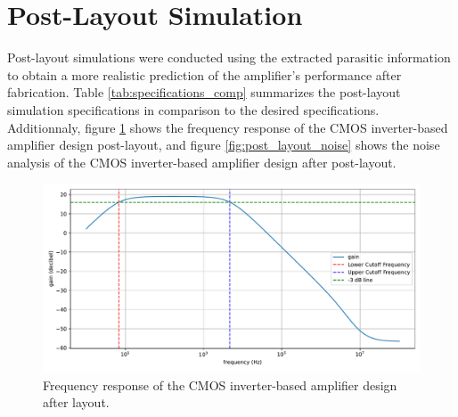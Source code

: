 \section{Post-Layout Simulation}
Post-layout simulations were conducted using the extracted parasitic information to obtain a more realistic prediction of the amplifier's performance after fabrication. 
Table \ref{tab:specifications_comp} summarizes the post-layout simulation specifications in comparison to the desired specifications.
\\
Additionnaly, figure \ref{fig:post_layout_frequency_response} shows the frequency response of the CMOS inverter-based amplifier design post-layout, 
and figure \ref{fig:post_layout_noise} shows the noise analysis of the CMOS inverter-based amplifier design after post-layout.

\begin{table}[ht!]
    \centering
    \caption{Specification Comparison}
    \label{tab:specifications_comp}
\end{table}

\begin{figure}[ht!]
    \centering
    \includegraphics[width=\textwidth]{Figures/post_layout_frequency_response.pdf}
    \caption{Frequency response of the CMOS inverter-based amplifier design after layout.}
    \label{fig:post_layout_frequency_response}
\end{figure}

